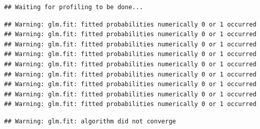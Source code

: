 \documentclass[
]{article}
\begin{document}
\begin{verbatim}
## Waiting for profiling to be done...
\end{verbatim}

\begin{verbatim}
## Warning: glm.fit: fitted probabilities numerically 0 or 1 occurred
## Warning: glm.fit: fitted probabilities numerically 0 or 1 occurred
## Warning: glm.fit: fitted probabilities numerically 0 or 1 occurred
## Warning: glm.fit: fitted probabilities numerically 0 or 1 occurred
## Warning: glm.fit: fitted probabilities numerically 0 or 1 occurred
## Warning: glm.fit: fitted probabilities numerically 0 or 1 occurred
## Warning: glm.fit: fitted probabilities numerically 0 or 1 occurred
## Warning: glm.fit: fitted probabilities numerically 0 or 1 occurred
## Warning: glm.fit: fitted probabilities numerically 0 or 1 occurred
\end{verbatim}

\begin{verbatim}
## Warning: glm.fit: algorithm did not converge
\end{verbatim}
\end{document}
